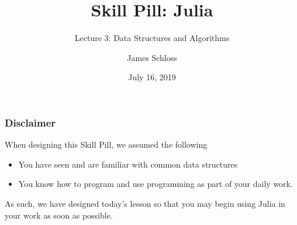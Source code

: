 \documentclass{beamer}
\title[Skill Pill]{Skill Pill: Julia} %
\subtitle{Lecture 3: Data Structures and Algorithms}
\author{James Schloss} %
\institute[OIST] %
{
Okinawa Institute of Science and Technology \\ %
\textit{james.schloss@oist.jp} %
}
\date{July 16, 2019} %
\begin{document}

\begin{frame}
\vspace*{1.4cm}
\titlepage %
\end{frame}



\begin{frame}
  \tableofcontents
\end{frame}

\begin{frame}
\frametitle{Disclaimer}

When designing this Skill Pill, we assumed the following
\begin{itemize}
\item You have seen and are familiar with common data structures
\item You know how to program and use programming as part of your daily work. 
\end{itemize}

As such, we have designed today's lesson so that you may begin using Julia in your work as soon as possible.

\end{frame}
\end{document}
